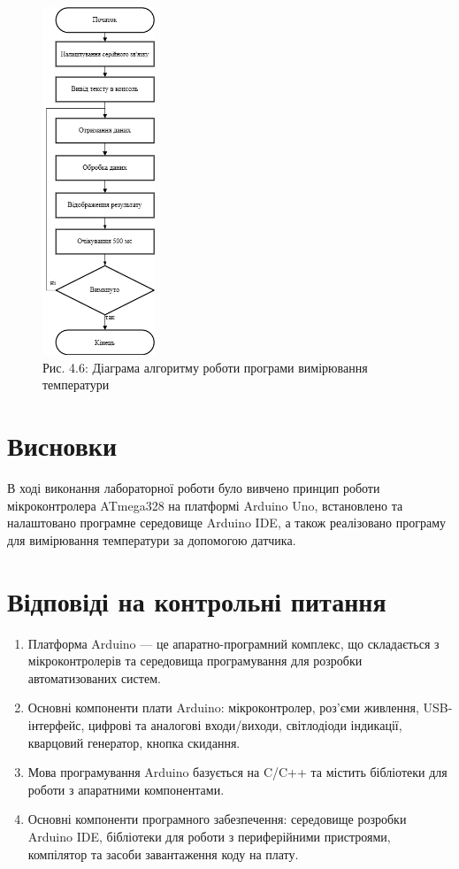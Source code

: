 \documentclass[a4paper]{article}
\begin{document}
\begin{figure}[h]
    \centering
    \includegraphics[width=0.3\textwidth]{imgs/LW4.01.png}
    \caption*{Рис. 4.6: Діаграма алгоритму роботи програми вимірювання температури}
\end{figure} 


\section*{Висновки}
В ході виконання лабораторної роботи було вивчено принцип роботи мікроконтролера ATmega328 на платформі Arduino Uno, встановлено та налаштовано програмне середовище Arduino IDE, а також реалізовано програму для вимірювання температури за допомогою датчика.

\section*{Відповіді на контрольні питання}
\begin{enumerate}
    \item Платформа Arduino — це апаратно-програмний комплекс, що складається з мікроконтролерів та середовища програмування для розробки автоматизованих систем.
    \item Основні компоненти плати Arduino: мікроконтролер, роз'єми живлення, USB-інтерфейс, цифрові та аналогові входи/виходи, світлодіоди індикації, кварцовий генератор, кнопка скидання.
    \item Мова програмування Arduino базується на C/C++ та містить бібліотеки для роботи з апаратними компонентами.
    \item Основні компоненти програмного забезпечення: середовище розробки Arduino IDE, бібліотеки для роботи з периферійними пристроями, компілятор та засоби завантаження коду на плату.
\end{enumerate}


    
\end{document}
